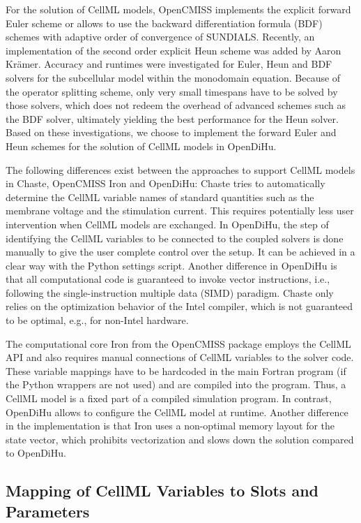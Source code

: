 For the solution of CellML models, OpenCMISS implements the explicit forward Euler scheme or allows to use the backward differentiation formula (BDF) schemes with adaptive order of convergence of SUNDIALS. Recently, an implementation of the second order explicit Heun scheme was added by Aaron Krämer. Accuracy and runtimes were investigated for Euler, Heun and BDF solvers for the subcellular model within the monodomain equation. Because of the operator splitting scheme, only very small timespans have to be solved by those solvers, which does not redeem the overhead of advanced schemes such as the BDF solver, ultimately yielding the best performance for the Heun solver. Based on these investigations, we choose to implement the forward Euler and Heun schemes for the solution of CellML models in OpenDiHu.

The following differences exist between the approaches to support CellML models in Chaste, OpenCMISS Iron and OpenDiHu:
Chaste tries to automatically determine the CellML variable names of standard quantities such as the membrane voltage and the stimulation current. This requires potentially less user intervention when CellML models are exchanged.
In OpenDiHu, the step of identifying the CellML variables to be connected to the coupled solvers is done manually to give the user complete control over the setup. It can be achieved in a clear way with the Python settings script. Another difference in OpenDiHu is that all computational code is guaranteed to invoke vector instructions, i.e., following the single-instruction multiple data (SIMD) paradigm. Chaste only relies on the optimization behavior of the Intel compiler, which is not guaranteed to be optimal, e.g., for non-Intel hardware.

The computational core Iron from the OpenCMISS package employs the CellML API and also requires manual connections of CellML variables to the solver code. These variable mappings have to be hardcoded in the main Fortran program (if the Python wrappers are not used) and are compiled into the program. Thus, a CellML model is a fixed part of a compiled simulation program. In contrast, OpenDiHu allows to configure the CellML model at runtime.
Another difference in the implementation is that Iron uses a non-optimal memory layout for the state vector, which prohibits vectorization and slows down the solution compared to OpenDiHu.

\subsection{Mapping of CellML Variables to Slots and Parameters}

